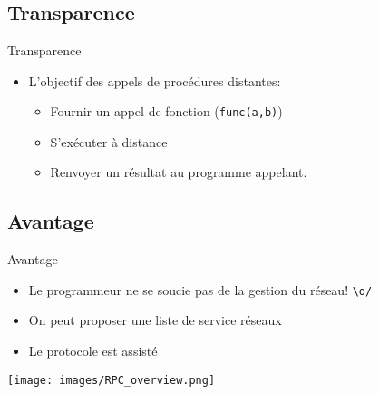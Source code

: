 \section{\sectitle}
\begin{frame}[containsverbatim]{\sectitle}
    \def\subsectitle{Transparence}
    \subsection{\subsectitle}
    \begin{block}{\subsectitle}
        \begin{itemize}
            \item L'objectif des appels de procédures distantes:
                \begin{itemize}
                    \item Fournir un appel de fonction (\verb+func(a,b)+)
                    \item S'exécuter à distance
                    \item Renvoyer un résultat au programme appelant.
                \end{itemize}
        \end{itemize}
    \end{block}
    \def\subsectitle{Avantage}
    \subsection{\subsectitle}
    \begin{block}{\subsectitle}
        \begin{itemize}
            \item Le programmeur ne se soucie pas de la gestion du réseau!
                \verb+\o/+
            \item On peut proposer une liste de service réseaux
            \item Le protocole est assisté
        \end{itemize}
    \end{block}
\end{frame}

\begin{frame}{\sectitle}
    \texttt{[image: images/RPC\_overview.png]}
\end{frame}

\def\sectitle{Outils connus}

